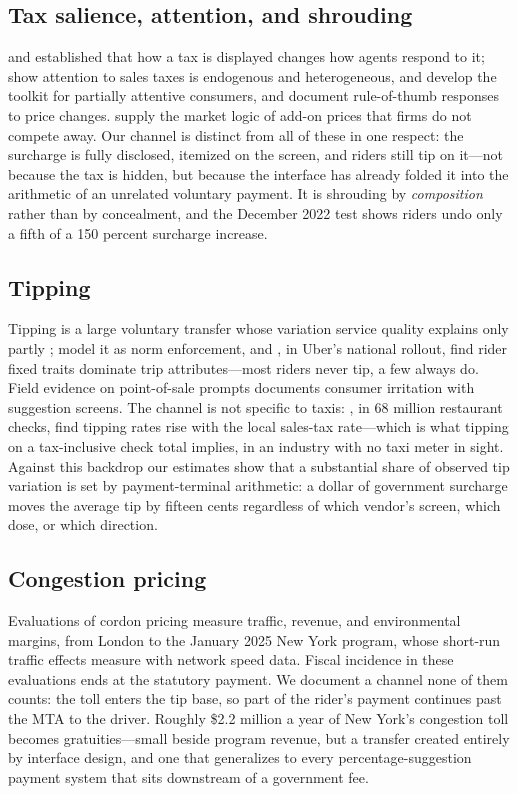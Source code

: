 \subsection{Tax salience, attention, and shrouding}
\textcite{chetty2009salience} and \textcite{finkelstein2009ezpass}
established that how a tax is displayed changes how agents respond to
it; \textcite{taubinsky2018attention} show attention to sales taxes is
endogenous and heterogeneous, \textcite{feldman2015tax} and
\textcite{goldin2013smoke} develop the toolkit for partially attentive
consumers, and \textcite{morrison2023rules} document rule-of-thumb
responses to price changes. \textcite{gabaix2006shrouded} supply the
market logic of add-on prices that firms do not compete away. Our
channel is distinct from all of these in one respect: the surcharge is
fully disclosed, itemized on the screen, and riders still tip on
it---not because the tax is hidden, but because the interface has
already folded it into the arithmetic of an unrelated voluntary
payment. It is shrouding by \emph{composition} rather than by
concealment, and the December 2022 test shows riders undo only a fifth
of a 150 percent surcharge increase.

\subsection{Tipping}
Tipping is a large voluntary transfer whose variation service quality
explains only partly \parencite{lynn2000tipping, azar2020tipping};
\textcite{conlin2003norm} model it as norm enforcement, and
\textcite{chandar2019drivers}, in Uber's national rollout, find rider
fixed traits dominate trip attributes---most riders never tip, a few
always do. Field evidence on point-of-sale prompts
\parencite{warren2021manipulated} documents consumer irritation with
suggestion screens. The channel is not specific to taxis:
\textcite{lynn2023largesample}, in 68 million restaurant checks, find
tipping rates rise with the local sales-tax rate---which is what tipping
on a tax-inclusive check total implies, in an industry with no taxi
meter in sight. Against this backdrop our estimates show that a
substantial share of observed tip variation is set by payment-terminal
arithmetic: a dollar of government surcharge moves the average tip by
fifteen cents regardless of which vendor's screen, which dose, or
which direction.

\subsection{Congestion pricing}
Evaluations of cordon pricing measure traffic, revenue, and
environmental margins, from London \parencite{leape2006london} to the
January 2025 New York program, whose short-run traffic effects
\textcite{cook2025congestion} measure with network speed data. Fiscal
incidence in these evaluations ends at the statutory payment. We
document a channel none of them counts: the toll enters the tip base,
so part of the rider's payment continues past the MTA to the driver.
Roughly \$2.2 million a year of New York's congestion toll becomes
gratuities---small beside program revenue, but a transfer created
entirely by interface design, and one that generalizes to every
percentage-suggestion payment system that sits downstream of a
government fee.
